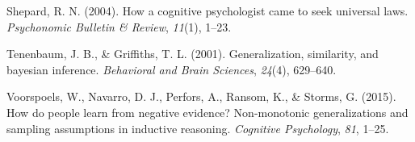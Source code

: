 \documentclass[english,doc]{apa6}
\begin{document}
\leavevmode\hypertarget{ref-shepard2004cognitive}{}%
Shepard, R. N. (2004). How a cognitive psychologist came to seek universal laws. \emph{Psychonomic Bulletin \& Review}, \emph{11}(1), 1--23.

\leavevmode\hypertarget{ref-tenenbaum2001generalization}{}%
Tenenbaum, J. B., \& Griffiths, T. L. (2001). Generalization, similarity, and bayesian inference. \emph{Behavioral and Brain Sciences}, \emph{24}(4), 629--640.

\leavevmode\hypertarget{ref-voorspoels2015people}{}%
Voorspoels, W., Navarro, D. J., Perfors, A., Ransom, K., \& Storms, G. (2015). How do people learn from negative evidence? Non-monotonic generalizations and sampling assumptions in inductive reasoning. \emph{Cognitive Psychology}, \emph{81}, 1--25.
\end{document}
